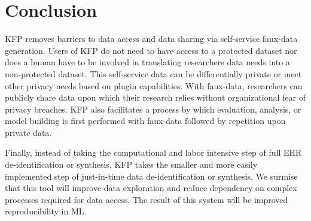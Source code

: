\documentclass{article}
\begin{document}

\section{Conclusion}

KFP removes barriers to data access and data sharing via self-service faux-data generation. Users of KFP do not need to have access to a protected dataset nor does a human have to be involved in translating researchers data needs into a non-protected dataset. This self-service data can be differentially private or meet other privacy needs based on plugin capabilities. With faux-data, researchers can publicly share data upon which their research relies without organizational fear of privacy breaches. KFP also facilitates a process by which evaluation, analysis, or model building is first performed with faux-data followed by repetition upon private data. 

Finally, instead of taking the computational and labor intensive step of full EHR de-identification or synthesis, KFP takes the smaller and more easily implemented step of just-in-time data de-identification or synthesis. We surmise that this tool will improve data exploration and reduce dependency on complex processes required for data access. The result of this system will be improved reproducibility in ML.




\end{document}
